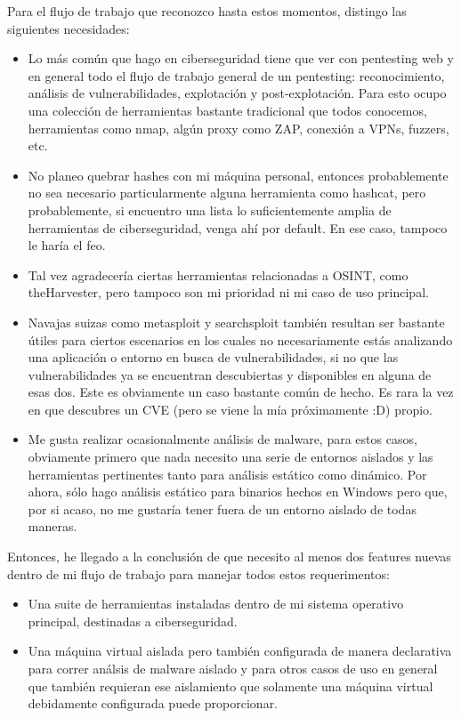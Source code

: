 \documentclass[11pt]{article}
\begin{document}
Para el flujo de trabajo que reconozco hasta estos momentos, distingo las siguientes necesidades:

\begin{itemize}
\item Lo más común que hago en ciberseguridad tiene que ver con pentesting web y en general todo el flujo de trabajo general de un pentesting: reconocimiento, análisis de vulnerabilidades, explotación y post-explotación. Para esto ocupo una colección de herramientas bastante tradicional que todos conocemos, herramientas como nmap, algún proxy como ZAP, conexión a VPNs, fuzzers, etc.

\item No planeo quebrar hashes con mi máquina personal, entonces probablemente no sea necesario particularmente alguna herramienta como hashcat, pero probablemente, si encuentro una lista lo suficientemente amplia de herramientas de ciberseguridad, venga ahí por default. En ese caso, tampoco le haría el feo.

\item Tal vez agradecería ciertas herramientas relacionadas a OSINT, como theHarvester, pero tampoco son mi prioridad ni mi caso de uso principal.

\item Navajas suizas como metasploit y searchsploit también resultan ser bastante útiles para ciertos escenarios en los cuales no necesariamente estás analizando una aplicación o entorno en busca de vulnerabilidades, si no que las vulnerabilidades ya se encuentran descubiertas y disponibles en alguna de esas dos. Este es obviamente un caso bastante común de hecho. Es rara la vez en que descubres un CVE (pero se viene la mía próximamente :D) propio.

\item Me gusta realizar ocasionalmente análisis de malware, para estos casos, obviamente primero que nada necesito una serie de entornos aislados y las herramientas pertinentes tanto para análisis estático como dinámico. Por ahora, sólo hago análisis estático para binarios hechos en Windows pero que, por si acaso, no me gustaría tener fuera de un entorno aislado de todas maneras.
\end{itemize}

Entonces, he llegado a la conclusión de que necesito al menos dos features nuevas dentro de mi flujo de trabajo para manejar todos estos requerimentos:

\begin{itemize}
\item Una suite de herramientas instaladas dentro de mi sistema operativo principal, destinadas a ciberseguridad.

\item Una máquina virtual aislada pero también configurada de manera declarativa para correr análsis de malware aislado y para otros casos de uso en general que también requieran ese aislamiento que solamente una máquina virtual debidamente configurada puede proporcionar.
\end{itemize}
\end{document}
